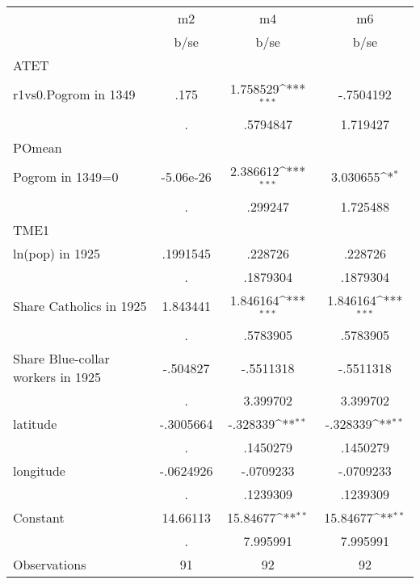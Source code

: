 {
\def\sym#1{\ifmmode^{#1}\else\(^{#1}\)\fi}
\begin{tabular}{l*{3}{c}}
\toprule
                &       m2         &       m4         &       m6         \\
                &     b/se         &     b/se         &     b/se         \\
\midrule
ATET            &                  &                  &                  \\
r1vs0.Pogrom in 1349&     .175         & 1.758529\sym{***}&-.7504192         \\
                &        .         & .5794847         & 1.719427         \\
\midrule
POmean          &                  &                  &                  \\
Pogrom in 1349=0&-5.06e-26         & 2.386612\sym{***}& 3.030655\sym{*}  \\
                &        .         &  .299247         & 1.725488         \\
\midrule
TME1            &                  &                  &                  \\
ln(pop) in 1925 & .1991545         &  .228726         &  .228726         \\
                &        .         & .1879304         & .1879304         \\
Share Catholics in 1925& 1.843441         & 1.846164\sym{***}& 1.846164\sym{***}\\
                &        .         & .5783905         & .5783905         \\
Share Blue-collar workers in 1925& -.504827         &-.5511318         &-.5511318         \\
                &        .         & 3.399702         & 3.399702         \\
latitude        &-.3005664         & -.328339\sym{**} & -.328339\sym{**} \\
                &        .         & .1450279         & .1450279         \\
longitude       &-.0624926         &-.0709233         &-.0709233         \\
                &        .         & .1239309         & .1239309         \\
Constant        & 14.66113         & 15.84677\sym{**} & 15.84677\sym{**} \\
                &        .         & 7.995991         & 7.995991         \\
\midrule
Observations    &       91         &       92         &       92         \\
\bottomrule
\end{tabular}
}
